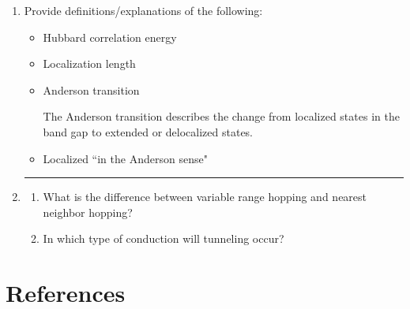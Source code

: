 \documentclass[12pt]{elsarticle}
\newcommand{\vs}{\vspace{2mm}}
\newcommand{\fullline}{\noindent\rule{14cm}{0.4pt} \vspace{4mm}}
\begin{document}
\begin{enumerate}
\fullline
\item Provide definitions/explanations of the following:
\begin{itemize}
	\item Hubbard correlation energy
	\item Localization length
	\item Anderson transition \par \vs
	The Anderson transition describes the change from localized states in the band gap to extended or delocalized states. \cite{Drabold2000}
	\item Localized ``in the Anderson sense"
\end{itemize}
\fullline
\item \begin{enumerate}
	\item What is the difference between variable range hopping and nearest neighbor hopping?
	\item In which type of conduction will tunneling occur?
\end{enumerate}

\end{enumerate}

\section*{References}


\end{document}
